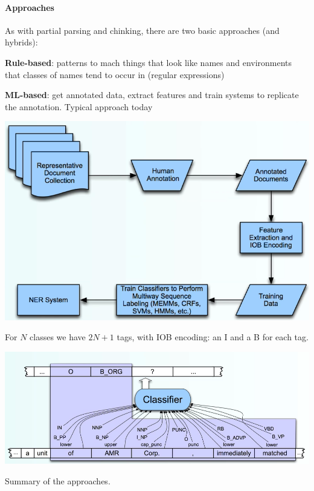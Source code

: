 \documentclass[10pt]{report}
\begin{document}
\paragraph{Approaches} As with partial parsing and chinking, there are two basic approaches (and hybrids):
\begin{list}{}{}
	\item \textbf{Rule-based}: patterns to mach things that look like names and environments that classes of names tend to occur in (regular expressions)
	\item \textbf{ML-based}: get annotated data, extract features and train systems to replicate the annotation. Typical approach today
\end{list}
\begin{center}
	\includegraphics[scale=0.33]{21.png}
\end{center}
For $N$ classes we have $2N + 1$ tags, with IOB encoding: an I and a B for each tag.
\begin{center}
	\includegraphics[scale=0.5]{22.png}
\end{center}
Summary of the approaches.
\end{document}

